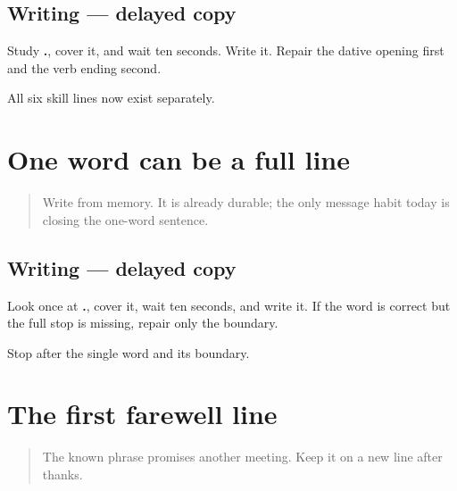 \subsection*{Writing — delayed copy}
Study \textbf{  .}, cover it, and wait ten seconds. Write it. Repair the dative opening first and the verb ending second.

\begin{tcolorbox}[breakable,colback=teal!4,colframe=teal!35!black,title={Before you move on}]
All six skill lines now exist separately.
\end{tcolorbox}
\section[\texorpdfstring{\mr{धन्यवाद}. (dhanyavād)}{धन्यवाद. (dhanyavād)}]{One word can be a full line}

\label{lesson:MR-A1M10-thanks-line}



\begin{quote}
Write \textbf{} from memory. It is already durable; the only message habit today is closing the one-word sentence.
\end{quote}

\subsection*{Writing — delayed copy}
Look once at \textbf{.}, cover it, wait ten seconds, and write it. If the word is correct but the full stop is missing, repair only the boundary.

\begin{tcolorbox}[breakable,colback=teal!4,colframe=teal!35!black,title={Before you move on}]
Stop after the single word and its boundary.
\end{tcolorbox}
\section[\texorpdfstring{\mr{पुन्हा} \mr{भेटू}. (punhā bheṭū)}{पुन्हा भेटू. (punhā bheṭū)}]{The first farewell line}

\label{lesson:MR-A1M11-again-line}



\begin{quote}
The known phrase \textbf{ } promises another meeting. Keep it on a new line after thanks.
\end{quote}

